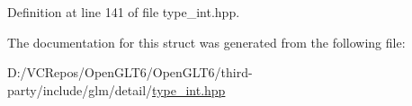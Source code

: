 Definition at line 141 of file type\+\_\+int.\+hpp.



The documentation for this struct was generated from the following file\+:\begin{DoxyCompactItemize}
\item 
D\+:/\+V\+C\+Repos/\+Open\+G\+L\+T6/\+Open\+G\+L\+T6/third-\/party/include/glm/detail/\mbox{\hyperlink{type__int_8hpp}{type\+\_\+int.\+hpp}}\end{DoxyCompactItemize}
